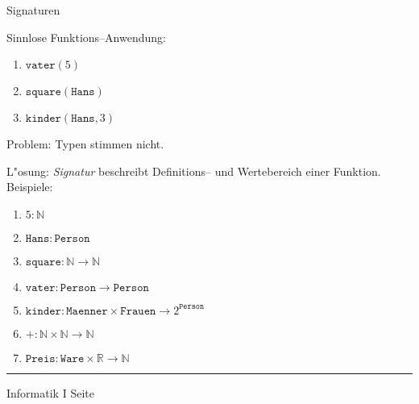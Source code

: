\begin{slide}{}
\normalsize
\begin{center}
Signaturen
\end{center}
\vspace{0.5cm}

\footnotesize
Sinnlose Funktions--Anwendung:
\begin{enumerate}
\item $\mathtt{vater}(5)$
\item $\mathtt{square}(\mathtt{Hans})$
\item $\mathtt{kinder}(\mathtt{Hans}, 3)$
\end{enumerate}
Problem: Typen stimmen nicht.

L"osung: \emph{Signatur} beschreibt Definitions-- und Wertebereich einer Funktion.
Beispiele:
\begin{enumerate}
\item $5: \mathbb{N}$
\item $\mathtt{Hans}: \mathtt{Person}$
\item $\mathtt{square}: \mathbb{N} \rightarrow \mathbb{N}$
\item $\mathtt{vater}: \mathtt{Person} \rightarrow \mathtt{Person}$
\item $\mathtt{kinder}: \mathtt{Maenner} \times \mathtt{Frauen} \rightarrow 2^\mathtt{Person}$
\item $+: \mathbb{N} \times \mathbb{N} \rightarrow \mathbb{N}$
\item $\mathtt{Preis}: \mathtt{Ware} \times \mathbb{R} \rightarrow \mathbb{N}$
\end{enumerate}

\vspace*{\fill}
\tiny \addtocounter{mypage}{1}
\rule{15cm}{1mm}
Informatik I  \hspace*{\fill} Seite 
\end{slide}


